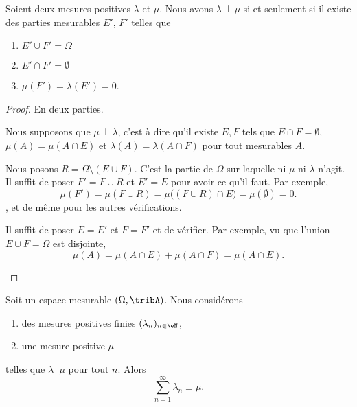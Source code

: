 \begin{lemma}		\label{LEMooDIGPooJqEwGl}
	Soient deux mesures positives \( \lambda\) et \( \mu\). Nous avons \( \lambda\perp\mu \) si et seulement si il existe des parties mesurables \( E'\), \( F'\) telles que
	\begin{enumerate}
		\item
		      $E'\cup F'=\Omega$
		\item
		      \( E'\cap F'=\emptyset\)
		\item
		      \( \mu(F')=\lambda(E')=0\).
	\end{enumerate}
\end{lemma}

\begin{proof}
	En deux parties.
	\begin{subproof}
		\spitem[\( \Rightarrow\)]
		Nous supposons que \( \mu\perp\lambda\), c'est à dire qu'il existe \( E,F\) tels que \( E\cap F=\emptyset\), \( \mu(A)=\mu(A\cap E)\) et \( \lambda(A)=\lambda(A\cap F)\) pour tout mesurables \( A\).

		Nous posons \( R=\Omega\setminus(E\cup F)\). C'est la partie de \( \Omega\) sur laquelle ni \( \mu\) ni \( \lambda\) n'agit. Il suffit de poser \( F'=F\cup R\) et \( E'=E\) pour avoir ce qu'il faut. Par exemple,
		\begin{equation}
			\mu(F')=\mu(F\cup R)=\mu\big( (F\cup R)\cap E \big)=\mu(\emptyset)=0.
		\end{equation},
		et de même pour les autres vérifications.

		\spitem[\( \Leftarrow\)]
		Il suffit de poser \( E=E'\) et \( F=F'\) et de vérifier. Par exemple, vu que l'union \( E\cup F=\Omega\) est disjointe,
		\begin{equation}
			\mu(A)=\mu(A\cap E)+\mu(A\cap F)=\mu(A\cap E).
		\end{equation}
	\end{subproof}
\end{proof}

\begin{lemma}		\label{LEMooVOJDooFgbwSE}
	Soit un espace mesurable \( (\Omega,\tribA)\). Nous considérons
	\begin{enumerate}
		\item
		      des mesures positives finies \( (\lambda_n)_{n\in \eN}\),
		\item
		      une mesure positive \( \mu\)
	\end{enumerate}
	telles que \( \lambda_\perp\mu\) pour tout \( n\). Alors
	\begin{equation}
		\sum_{n=1}^{\infty}\lambda_n\perp\mu.
	\end{equation}
\end{lemma}

